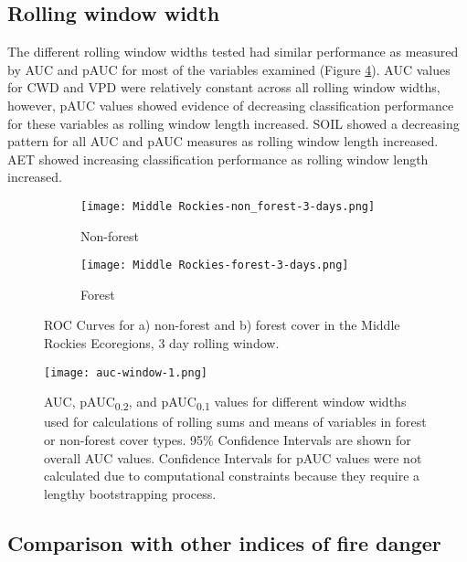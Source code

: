 \documentclass[11p]{article}
\newcommand{\pauc}[1]{pAUC\textsubscript{#1}}
\begin{document}
\subsection{Rolling window width}

The different rolling window widths tested had similar performance as measured by AUC and pAUC for most of the variables examined (Figure \ref{fig:auc_window}). AUC values for CWD and VPD were relatively constant across all rolling window widths, however, pAUC values showed evidence of decreasing classification performance for these variables as rolling window length increased. SOIL showed a decreasing pattern for all AUC and pAUC measures as rolling window length increased. AET showed increasing classification performance as rolling window length increased.  

\begin{figure}[htbp]
  \centering
  \begin{subfigure}{.5\textwidth}
    \centering
    \texttt{[image: Middle Rockies-non\_forest-3-days.png]}
    \caption{Non-forest}
    \label{fig:mr-nf-auc}
  \end{subfigure}%
  \begin{subfigure}{.5\textwidth}
    \centering
    \texttt{[image: Middle Rockies-forest-3-days.png]}
    \caption{Forest}
    \label{fig:mr-f-auc}
  \end{subfigure}
  \caption{ROC Curves for a) non-forest and b) forest cover in the Middle Rockies Ecoregions, 3 day rolling window.}
  \label{fig:auc}
\end{figure}

\begin{figure}[htbp]
  \centering
  \texttt{[image: auc-window-1.png]}
  \caption{AUC, \pauc{0.2}, and \pauc{0.1} values for different window widths used for calculations of rolling sums and means of variables in forest or non-forest cover types. 95\% Confidence Intervals are shown for overall AUC values. Confidence Intervals for pAUC values were not calculated due to computational constraints because they require a lengthy bootstrapping process.}
  \label{fig:auc_window}
\end{figure}

\subsection{Comparison with other indices of fire danger}
\end{document}
